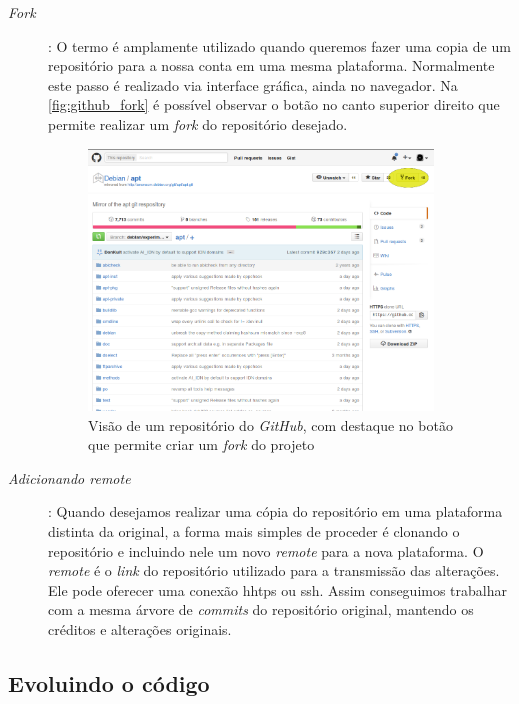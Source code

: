 \begin{description}
	\item [\textit{Fork}]: O termo é amplamente utilizado quando queremos fazer uma copia de um repositório para a nossa conta em uma mesma plataforma. Normalmente este passo é realizado via interface gráfica, ainda no navegador. Na \autoref{fig:github_fork} é possível observar o botão no canto superior direito que permite realizar um \textit{fork} do repositório desejado.

	\begin{figure}[h]
	  \centering
		\includegraphics[width=0.90\textwidth]{figuras/fork}
	  \caption{Visão de um repositório do \textit{GitHub}, com destaque no botão que permite criar um \textit{fork} do projeto}
	  \label{fig:github_fork}
	\end{figure}

	\item [\textit{Adicionando \textit{remote}}]: Quando desejamos realizar uma cópia do repositório em uma plataforma distinta da original, a forma mais simples de proceder é clonando o repositório e incluindo nele um novo \textit{remote} para a nova plataforma. O \textit{remote} é o \textit{link} do repositório utilizado para a transmissão das alterações. Ele pode oferecer uma conexão {\code hhtps} ou {\code ssh}. Assim conseguimos trabalhar com a mesma árvore de \textit{commits} do repositório original, mantendo os créditos e alterações originais.
\end{description}

\subsection*{Evoluindo o código} %
\label{sub:evoluindo_o_c_digo}

